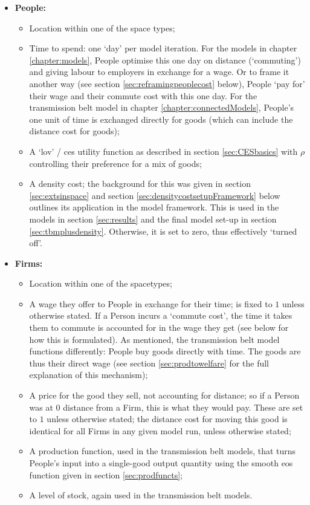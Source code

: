 \begin{itemize}
	\item \textbf{People:}
		\begin{itemize}
			\item Location within one of the space types;
			\item Time to spend: one `day' per model iteration. For the models in chapter \ref{chapter:models}, People optimise this one day on distance (`commuting') and giving labour to employers in exchange for a wage. Or to frame it another way (see section \ref{sec:reframingpeoplecost} below), People `pay for' their wage and their commute cost with this one day. For the transmission belt model in chapter \ref{chapter:connectedModels}, People's one unit of time is exchanged directly for goods (which can include the distance cost for goods);
			\item A `\gls{lov}' / \gls{ces} utility function as described in section \ref{sec:CESbasics} with $\rho$ controlling their preference for a mix of goods;
			\item A density cost; the background for this was given in section \ref{sec:extsinspace} and section \ref{sec:densitycostsetupFramework} below outlines its application in the model framework. This is used in the models in section \ref{sec:results} and the final model set-up in section \ref{sec:tbmplusdensity}. Otherwise, it is set to zero, thus effectively `turned off'.
		\end{itemize}
	\item \textbf{Firms:}
		\begin{itemize}
			\item Location within one of the spacetypes;
			\item A wage they offer to People in exchange for their time; is fixed to $1$ unless otherwise stated. If a Person incurs a `commute cost', the time it takes them to commute is accounted for in the wage they get (see below for how this is formulated). As mentioned, the transmission belt model functions differently: People buy goods directly with time. The goods are thus their direct wage (see section \ref{sec:prodtowelfare} for the full explanation of this mechanism);
\item A price for the good they sell, not accounting for distance; so if a Person was at $0$ distance from a Firm, this is what they would pay. These are set to $1$ unless otherwise stated; the distance cost for moving this good is identical for all Firms in any given model run, unless otherwise stated;
\item A production function, used in the transmission belt models, that turns People's input into a single-good output quantity using the smooth \gls{eos} function given in section \ref{sec:prodfuncts};
\item A level of stock, again used in the transmission belt models.
		\end{itemize}
\end{itemize}

